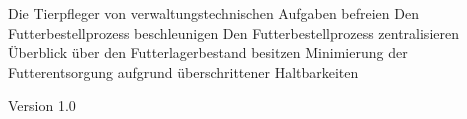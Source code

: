 %
{}{Die Tierpfleger von verwaltungstechnischen Aufgaben befreien \newline 
	Den Futterbestellprozess beschleunigen \newline 
	Den Futterbestellprozess zentralisieren \newline 
	Überblick über den Futterlagerbestand besitzen \newline 
	Minimierung der Futterentsorgung aufgrund über\-schrittener Haltbarkeiten
\begin{flushright}
	\textnormal{\textsf{\footnotesize{Version 1.0}}}
\end{flushright}
}%
{}{}%
{}%


